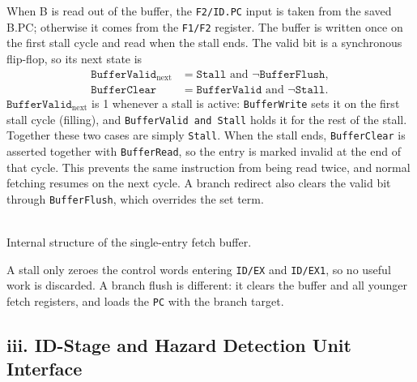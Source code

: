 \documentclass[11pt, a4paper]{article}
\begin{document}
When B is read out of the buffer, the \texttt{F2/ID.PC} input is taken from the saved B.PC; otherwise it comes from the \texttt{F1/F2} register. The buffer is written once on the first stall cycle and read when the stall ends. The valid bit is a synchronous flip-flop, so its next state is
\begin{align*}
\texttt{BufferValid}_{\text{next}} &= \texttt{Stall}\text{ and }\neg\texttt{BufferFlush},\\
\texttt{BufferClear} &= \texttt{BufferValid}\text{ and }\neg\texttt{Stall}.
\end{align*}
$\texttt{BufferValid}_{\text{next}}$ is 1 whenever a stall is active: \texttt{BufferWrite} sets it on the first stall cycle (filling), and \texttt{BufferValid and Stall} holds it for the rest of the stall. Together these two cases are simply \texttt{Stall}. When the stall ends, \texttt{BufferClear} is asserted together with \texttt{BufferRead}, so the entry is marked invalid at the end of that cycle. This prevents the same instruction from being read twice, and normal fetching resumes on the next cycle. A branch redirect also clears the valid bit through \texttt{BufferFlush}, which overrides the set term.

\begin{center}
\resizebox{0.6\textwidth}{!}{}\\[2pt]
{\footnotesize Internal structure of the single-entry fetch buffer.}
\end{center}

A stall only zeroes the control words entering \texttt{ID/EX} and \texttt{ID/EX1}, so no useful work is discarded. A branch flush is different: it clears the buffer and all younger fetch registers, and loads the \texttt{PC} with the branch target.

\subsection*{iii. ID-Stage and Hazard Detection Unit Interface}

\end{document}

